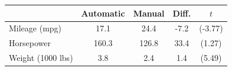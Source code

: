 \begin{tabular}{l*{4}{c}}
\doublerule
                &Automatic&   Manual&           Diff.&      $t$\\
\midrule
Mileage (mpg)   &     17.1&     24.4&   -7.2\sym{***}&  (-3.77)\\
Horsepower      &    160.3&    126.8&            33.4&   (1.27)\\
Weight (1000 lbs)&      3.8&      2.4&    1.4\sym{***}&   (5.49)\\
\midrule
\end{tabular}
